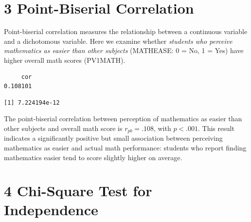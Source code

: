 \documentclass[
  letterpaper,
  DIV=11,
  numbers=noendperiod]{scrreprt}
\newenvironment{Shaded}{\begin{snugshade}}{\end{snugshade}}
\newcommand{\AttributeTok}[1]{\textcolor[rgb]{0.40,0.45,0.13}{#1}}
\newcommand{\CommentTok}[1]{\textcolor[rgb]{0.37,0.37,0.37}{#1}}
\newcommand{\FunctionTok}[1]{\textcolor[rgb]{0.28,0.35,0.67}{#1}}
\newcommand{\NormalTok}[1]{\textcolor[rgb]{0.00,0.23,0.31}{#1}}
\newcommand{\OtherTok}[1]{\textcolor[rgb]{0.00,0.23,0.31}{#1}}
\newcommand{\SpecialCharTok}[1]{\textcolor[rgb]{0.37,0.37,0.37}{#1}}
\newcommand{\StringTok}[1]{\textcolor[rgb]{0.13,0.47,0.30}{#1}}
\begin{document}
\section*{3 Point-Biserial
Correlation}\label{point-biserial-correlation}


Point-biserial correlation measures the relationship between a
continuous variable and a dichotomous variable. Here we examine whether
\emph{students who perceive mathematics as easier than other subjects}
(MATHEASE: 0 = No, 1 = Yes) have higher overall math scores (PV1MATH).

\begin{Shaded}
\end{Shaded}

\begin{verbatim}
     cor 
0.108101 
\end{verbatim}

\begin{Shaded}
\end{Shaded}

\begin{verbatim}
[1] 7.224194e-12
\end{verbatim}

The point-biserial correlation between perception of mathematics as
easier than other subjects and overall math score is \(r_{pb} = .108\),
with \(p<.001\). This result indicates a significantly positive but
small association between perceiving mathematics as easier and actual
math performance: students who report finding mathematics easier tend to
score slightly higher on average.

\section*{4 Chi-Square Test for
Independence}\label{chi-square-test-for-independence-1}
\end{document}
